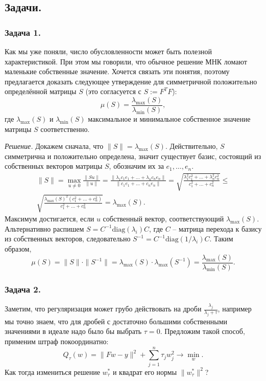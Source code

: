 \newpage
\subsection*{Задачи.}

\subsubsection*{Задача 1.} Как мы уже поняли, число обусловленности может быть полезной характеристикой. При этом мы говорили, что обычное решение МНК ломают маленькие собственные значение. Хочется связать эти понятия, поэтому предлагается доказать следующее утверждение для симметричной положительно определённой матрицы $S$ (это согласуется с $S := F^TF$):
$$\mu(S) = \frac{\lambda_{\max}(S)}{\lambda_{\min}(S)},$$
где $\lambda_{\max}(S)$ и $\lambda_{\min}(S)$ максимальное и минимальное собственное значение матрицы $S$ соответственно.

\noindent\textit{Решение.} Докажем сначала, что $\|S\| = \lambda_{\max}(S)$. Действительно, $S$ симметрична и положительно определена, значит существует базис, состоящий из собственных векторов матрицы $S$, обозначим их за $e_1, \dots, e_n$.
\begin{gather*}
  \|S\| = \max_{u \not= 0} \frac{\|Su\|}{\|u\|} = \frac{\|\lambda_1c_1e_1 + \dots + \lambda_nc_ne_n\|}{\|c_1e_1 + \dots + c_ne_n\|} = \sqrt{\frac{\lambda_1^2c_1^2 + \dots + \lambda_n^2c_n^2}{c_1^2 + \dots + c_n^2}} \leqslant \\
  \sqrt{\frac{\lambda_{\max}(S)^2(c_1^2 + \dots + c_n^2)}{c_1^2 + \dots + c_n^2}} = \lambda_{\max}(S).
\end{gather*}
Максимум достигается, если $u$ собственный вектор, соответствующий $\lambda_{\max}(S)$. Альтернативно распишем $S = C^{-1} \text{diag}(\lambda_i) C$, где $C$ -- матрица перехода к базису из собственных векторов, следовательно $S^{-1} = C^{-1} \text{diag}(1/\lambda_i) C$. Таким образом,
$$\mu(S) = \|S\| \cdot \|S^{-1}\| = \lambda_{\max}(S) \cdot \lambda_{\max}(S^{-1}) = \frac{\lambda_{\max}(S)}{\lambda_{\min}(S)}.$$

\subsubsection*{Задача 2.} Заметим, что регуляризация может грубо действовать на дроби $\displaystyle\frac{\lambda_j}{\lambda_j + \tau}$, например мы точно знаем, что для дробей с достаточно большими собственными значениями в идеале надо было бы выбрать $\tau = 0$. Предложим такой способ, применим штраф покоординатно:
$$Q_\tau(w) = \|Fw - y\|^2 + \sum_{j=1}^n\tau_jw_j^2 \to \min_w.$$
Как тогда измениться решение $w_\tau^*$ и квадрат его нормы $\|w_\tau^*\|^2$?

